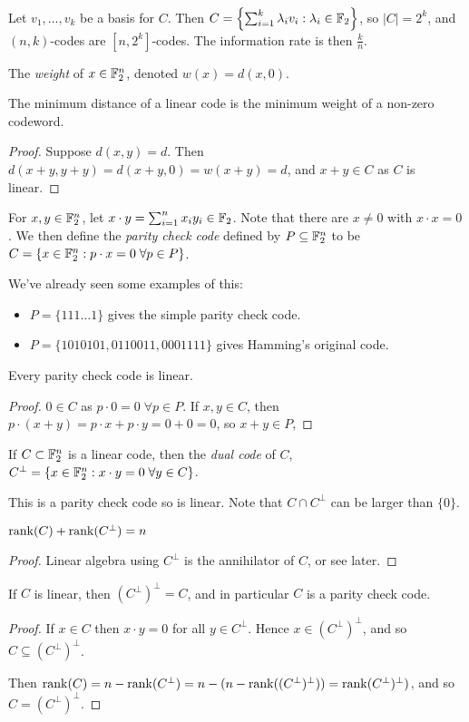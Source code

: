 \documentclass[10pt,a4paper]{article}
\begin{document}
Let $v_1, \ldots, v_k$ be a basis for $C$. Then $C = \left\{\sum_{i=1}^k \lambda_i v_i : \lambda_i \in \mathbb{F}_2\right\}$, so $|C| = 2^k$, and $(n,k)$-codes are $[n,2^k]$-codes. The information rate is then $\frac{k}{n}$.

The \emph{weight} of $x \in \mathbb{F}_2^n$, denoted $w(x) = d(x,0)$.

\begin{lemma}
The minimum distance of a linear code is the minimum weight of a non-zero codeword.
\end{lemma}
\begin{proof}
Suppose $d(x,y) = d$. Then $d(x+y, y+y) = d(x+y,0) = w(x+y) = d$, and $x+y \in C$ as $C$ is linear.
\end{proof}

For $x, y \in \mathbb{F}_2^n$, let $x\cdot y = \sum_{i=1}^n x_iy_i \in \mathbb{F}_2$. Note that there are $x \neq 0$ with $x\cdot x = 0$. We then define the \emph{parity check code} defined by $P \subseteq \mathbb{F}_2^n$ to be $C = \{x \in \mathbb{F}_2^n : p\cdot x = 0 \;\forall p\in P\}$.

We've already seen some examples of this:
\begin{itemize}
\item $P = \{111\ldots 1\}$ gives the simple parity check code.
\item $P = \{1010101,0110011,0001111\}$ gives Hamming's original code.
\end{itemize}
\begin{lemma}
Every parity check code is linear.
\end{lemma}
\begin{proof}
$0 \in C$ as $p\cdot 0 = 0\;\forall p \in P$. If $x, y \in C$, then $p\cdot(x+y)=p\cdot x+p\cdot y = 0+0 = 0$, so $x+y \in P$,
\end{proof}

If $C \subset \mathbb{F}_2^n$ is a linear code, then the \emph{dual code} of $C$, $C^{\bot} = \{x\in\mathbb{F}_2^n: x\cdot y =0 \;\forall y \in C\}$.

This is a parity check code so is linear. Note that $C \cap C^{\bot}$ can be larger than $\{0\}$.

\begin{lemma}
$\operatorname{rank}(C) + \operatorname{rank}(C^{\bot}) = n$
\end{lemma}
\begin{proof}
Linear algebra using $C^{\bot}$ is the annihilator of $C$, or see later.
\end{proof}
\begin{lemma}
If $C$ is linear, then $(C^{\bot})^{\bot} = C$, and in particular $C$ is a parity check code.
\end{lemma}
\begin{proof}
If $x \in C$ then $x \cdot y = 0$ for all $y \in C^{\bot}$. Hence $x \in (C^{\bot})^{\bot}$, and so $C \subseteq (C^{\bot})^{\bot}$.

Then $\operatorname{rank}(C) = n - \operatorname{rank}(C^{\bot}) = n-(n-\operatorname{rank}((C^{\bot})^{\bot})) = \operatorname{rank}(C^{\bot})^{\bot})$, and so $C = (C^{\bot})^\bot$.
\end{proof}
\end{document}
